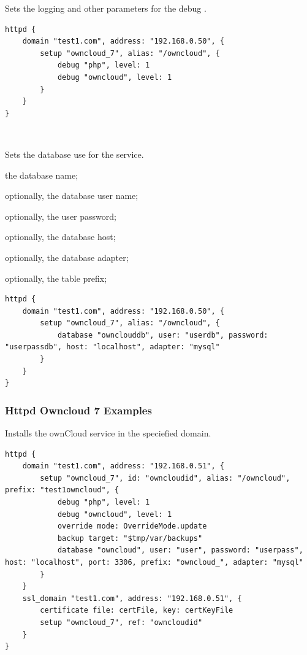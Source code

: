 Sets the logging  and other parameters for the debug .

\begin{lstlisting}[style=Java]
httpd {
    domain "test1.com", address: "192.168.0.50", {
        setup "owncloud_7", alias: "/owncloud", {
            debug "php", level: 1
            debug "owncloud", level: 1
        }
    }
}
\end{lstlisting}

 \\

Sets the database use for the service.
\begin{asparaitem}
\item {} the database name;
\item {} optionally, the database user name;
\item {} optionally, the user password;
\item {} optionally, the database host;
\item {} optionally, the database adapter;
\item {} optionally, the table prefix;
\end{asparaitem}

\begin{lstlisting}[style=Java]
httpd {
    domain "test1.com", address: "192.168.0.50", {
        setup "owncloud_7", alias: "/owncloud", {
            database "ownclouddb", user: "userdb", password: "userpassdb", host: "localhost", adapter: "mysql"
        }
    }
}
\end{lstlisting}

\subsubsection{Httpd Owncloud 7 Examples}

Installs the ownCloud service in the speciefied domain.

\begin{lstlisting}[style=Sscontrol,
label={lst:owncloud_7_example_script_base},
title={Httpd.groovy}]
httpd {
    domain "test1.com", address: "192.168.0.51", {
        setup "owncloud_7", id: "owncloudid", alias: "/owncloud", prefix: "test1owncloud", {
            debug "php", level: 1
            debug "owncloud", level: 1
            override mode: OverrideMode.update
            backup target: "$tmp/var/backups"
            database "owncloud", user: "user", password: "userpass", host: "localhost", port: 3306, prefix: "owncloud_", adapter: "mysql"
        }
    }
    ssl_domain "test1.com", address: "192.168.0.51", {
        certificate file: certFile, key: certKeyFile
        setup "owncloud_7", ref: "owncloudid"
    }
}
\end{lstlisting}

